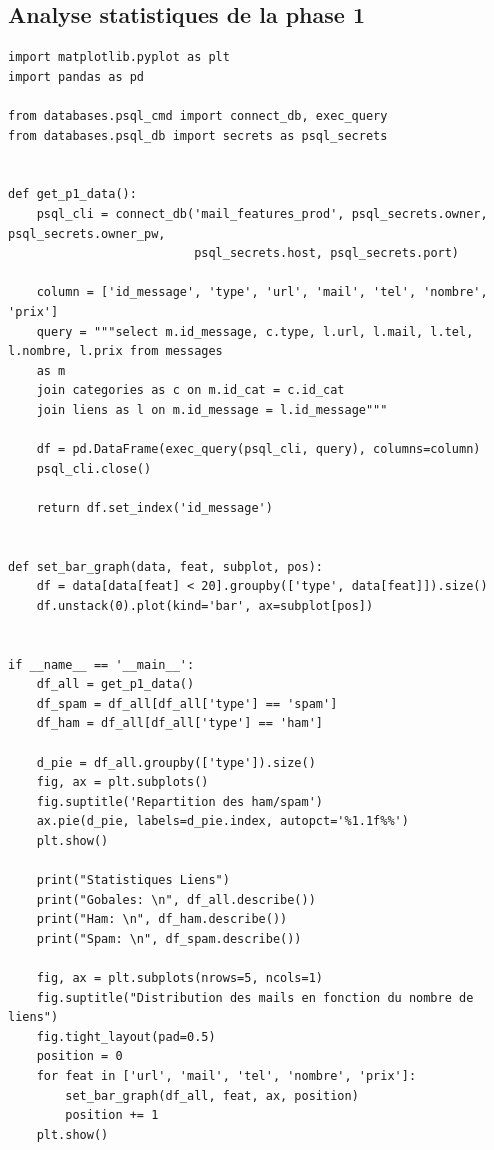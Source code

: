 \documentclass[a4paper,12pt]{article}
\begin{document}
		\subsection{Analyse statistiques de la phase 1}
		\label{subsec:analp1}
			\begin{lstlisting}[title=Code pour l'affichage des statistiques de la phase 1]
import matplotlib.pyplot as plt
import pandas as pd

from databases.psql_cmd import connect_db, exec_query
from databases.psql_db import secrets as psql_secrets


def get_p1_data():
    psql_cli = connect_db('mail_features_prod', psql_secrets.owner, psql_secrets.owner_pw,
                          psql_secrets.host, psql_secrets.port)

    column = ['id_message', 'type', 'url', 'mail', 'tel', 'nombre', 'prix']
    query = """select m.id_message, c.type, l.url, l.mail, l.tel, l.nombre, l.prix from messages 
    as m 
    join categories as c on m.id_cat = c.id_cat
    join liens as l on m.id_message = l.id_message"""

    df = pd.DataFrame(exec_query(psql_cli, query), columns=column)
    psql_cli.close()

    return df.set_index('id_message')


def set_bar_graph(data, feat, subplot, pos):
    df = data[data[feat] < 20].groupby(['type', data[feat]]).size()
    df.unstack(0).plot(kind='bar', ax=subplot[pos])


if __name__ == '__main__':
    df_all = get_p1_data()
    df_spam = df_all[df_all['type'] == 'spam']
    df_ham = df_all[df_all['type'] == 'ham']

    d_pie = df_all.groupby(['type']).size()
    fig, ax = plt.subplots()
    fig.suptitle('Repartition des ham/spam')
    ax.pie(d_pie, labels=d_pie.index, autopct='%1.1f%%')
    plt.show()

    print("Statistiques Liens")
    print("Gobales: \n", df_all.describe())
    print("Ham: \n", df_ham.describe())
    print("Spam: \n", df_spam.describe())

    fig, ax = plt.subplots(nrows=5, ncols=1)
    fig.suptitle("Distribution des mails en fonction du nombre de liens")
    fig.tight_layout(pad=0.5)
    position = 0
    for feat in ['url', 'mail', 'tel', 'nombre', 'prix']:
        set_bar_graph(df_all, feat, ax, position)
        position += 1
    plt.show()
				\end{lstlisting}
\end{document}

